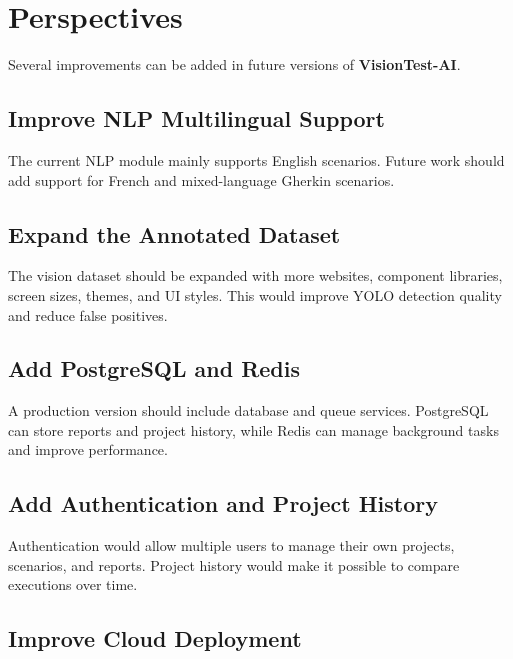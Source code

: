 \section{Perspectives}
\label{sec:perspectives}

Several improvements can be added in future versions of \textbf{VisionTest-AI}.

\subsection{Improve NLP Multilingual Support}
\label{subsec:improve_multilingual_support}

The current NLP module mainly supports English scenarios. Future work should add support for French and mixed-language Gherkin scenarios.

\subsection{Expand the Annotated Dataset}
\label{subsec:expand_dataset}

The vision dataset should be expanded with more websites, component libraries, screen sizes, themes, and UI styles. This would improve YOLO detection quality and reduce false positives.

\subsection{Add PostgreSQL and Redis}
\label{subsec:add_postgres_redis}

A production version should include database and queue services. PostgreSQL can store reports and project history, while Redis can manage background tasks and improve performance.

\subsection{Add Authentication and Project History}
\label{subsec:add_auth_project_history}

Authentication would allow multiple users to manage their own projects, scenarios, and reports. Project history would make it possible to compare executions over time.

\subsection{Improve Cloud Deployment}
\label{subsec:improve_cloud_deployment}

